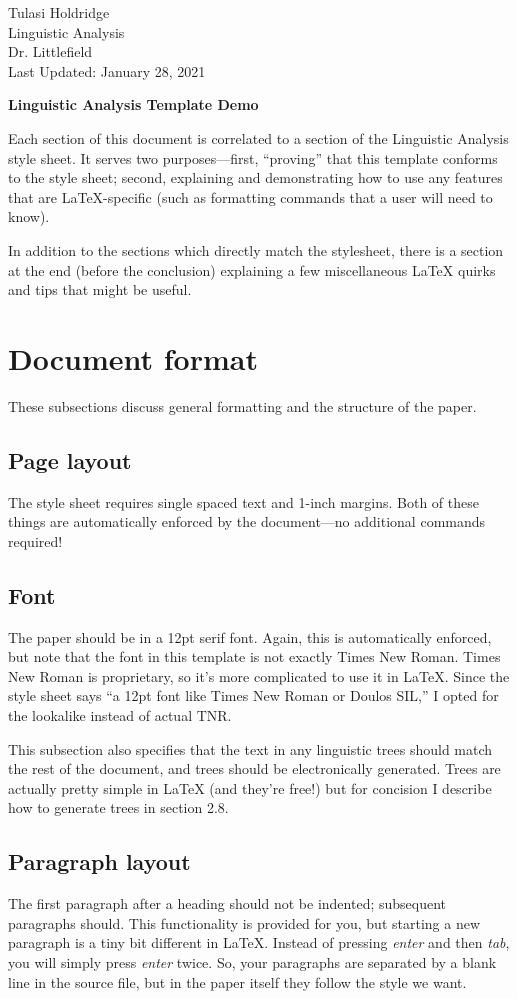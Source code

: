 \documentclass[12pt]{article}
\newcommand{\titletext}[1]
{\begin{center}
		\textbf{#1}
\end{center}}
\newcommand{\headertext}[4]
{\begin{flushleft}
		#1
		\\ #2
		\\ #3
		\\ #4
\end{flushleft}}
\begin{document}
	
	\headertext{Tulasi Holdridge}{Linguistic Analysis}{Dr. Littlefield}{Last Updated: January 28, 2021}
	
	\titletext{Linguistic Analysis Template Demo}
	Each section of this document is correlated to a section of the Linguistic Analysis style sheet. It serves two purposes---first, ``proving'' that this template conforms to the style sheet; second, explaining and demonstrating how to use any features that are LaTeX-specific (such as formatting commands that a user will need to know).
	
	In addition to the sections which directly match the stylesheet, there is a section at the end (before the conclusion) explaining a few miscellaneous LaTeX quirks and tips that might be useful.
	
	\section{Document format}
	These subsections discuss general formatting and the structure of the paper.
	
	\subsection{Page layout}
	The style sheet requires single spaced text and 1-inch margins. Both of these things are automatically enforced by the document---no additional commands required!
	
	\subsection{Font}
	The paper should be in a 12pt serif font. Again, this is automatically enforced, but note that the font in this template is not exactly Times New Roman. Times New Roman is proprietary, so it's more complicated to use it in LaTeX. Since the style sheet says ``a 12pt font like Times New Roman or Doulos SIL,'' I opted for the lookalike instead of actual TNR.
	
	This subsection also specifies that the text in any linguistic trees should match the rest of the document, and trees should be electronically generated. Trees are actually pretty simple in LaTeX (and they're free!) but for concision I describe how to generate trees in section 2.8.
	
	\subsection{Paragraph layout}
	The first paragraph after a heading should not be indented; subsequent paragraphs should. This functionality is provided for you, but starting a new paragraph is a tiny bit different in LaTeX. Instead of pressing \textit{enter} and then \textit{tab}, you will simply press \textit{enter} twice. So, your paragraphs are separated by a blank line in the source file, but in the paper itself they follow the style we want.
	
\end{document}
